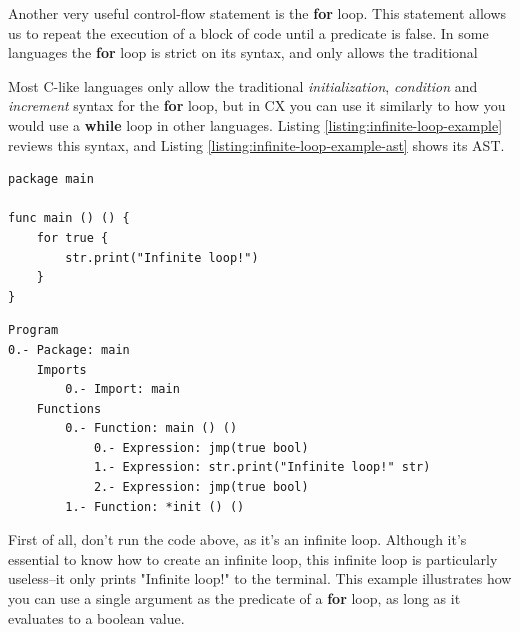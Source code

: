 \documentclass[11pt,fleqn,openany]{book} %
\begin{document}

Another very useful control-flow statement is the \textbf{for} loop. This statement allows us to repeat the execution of a block of code until a predicate is false. In some languages the \textbf{for} loop is strict on its syntax, and only allows the traditional

Most C-like languages only allow the traditional \emph{initialization}, \emph{condition} and \emph{increment} syntax for the \textbf{for} loop, but in CX you can use it similarly to how you would use a \textbf{while} loop in other languages. Listing \ref{listing:infinite-loop-example} reviews this syntax, and Listing \ref{listing:infinite-loop-example-ast} shows its AST.

\begin{lstlisting}[caption={Infinite Loop Example},captionpos=b,label={listing:infinite-loop-example}]
package main

func main () () {
	for true {
		str.print("Infinite loop!")
	}
}
\end{lstlisting}

\begin{lstlisting}[caption={Listing \ref{listing:infinite-loop-example}'s Abstract Syntax Tree},captionpos=b,label={listing:infinite-loop-example-ast}]
Program
0.- Package: main
	Imports
		0.- Import: main
	Functions
		0.- Function: main () ()
			0.- Expression: jmp(true bool)
			1.- Expression: str.print("Infinite loop!" str)
			2.- Expression: jmp(true bool)
		1.- Function: *init () ()
\end{lstlisting}

First of all, don't run the code above, as it's an infinite loop. Although it's essential to know how to create an infinite loop, this infinite loop is particularly useless--it only prints "Infinite loop!" to the terminal. This example illustrates how you can use a single argument as the predicate of a \textbf{for} loop, as long as it evaluates to a boolean value.
\end{document}
